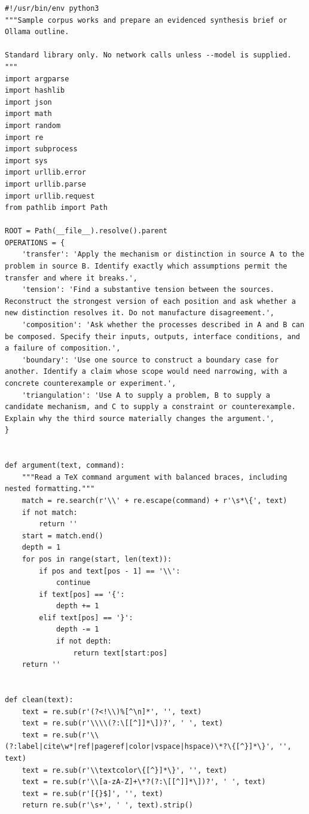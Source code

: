 \documentclass[11pt]{article}
\begin{document}
\begin{lstlisting}
#!/usr/bin/env python3
"""Sample corpus works and prepare an evidenced synthesis brief or Ollama outline.

Standard library only. No network calls unless --model is supplied.
"""
import argparse
import hashlib
import json
import math
import random
import re
import subprocess
import sys
import urllib.error
import urllib.parse
import urllib.request
from pathlib import Path

ROOT = Path(__file__).resolve().parent
OPERATIONS = {
    'transfer': 'Apply the mechanism or distinction in source A to the problem in source B. Identify exactly which assumptions permit the transfer and where it breaks.',
    'tension': 'Find a substantive tension between the sources. Reconstruct the strongest version of each position and ask whether a new distinction resolves it. Do not manufacture disagreement.',
    'composition': 'Ask whether the processes described in A and B can be composed. Specify their inputs, outputs, interface conditions, and a failure of composition.',
    'boundary': 'Use one source to construct a boundary case for another. Identify a claim whose scope would need narrowing, with a concrete counterexample or experiment.',
    'triangulation': 'Use A to supply a problem, B to supply a candidate mechanism, and C to supply a constraint or counterexample. Explain why the third source materially changes the argument.',
}


def argument(text, command):
    """Read a TeX command argument with balanced braces, including nested formatting."""
    match = re.search(r'\\' + re.escape(command) + r'\s*\{', text)
    if not match:
        return ''
    start = match.end()
    depth = 1
    for pos in range(start, len(text)):
        if pos and text[pos - 1] == '\\':
            continue
        if text[pos] == '{':
            depth += 1
        elif text[pos] == '}':
            depth -= 1
            if not depth:
                return text[start:pos]
    return ''


def clean(text):
    text = re.sub(r'(?<!\\)%[^\n]*', '', text)
    text = re.sub(r'\\\\(?:\[[^]]*\])?', ' ', text)
    text = re.sub(r'\\(?:label|cite\w*|ref|pageref|color|vspace|hspace)\*?\{[^}]*\}', '', text)
    text = re.sub(r'\\textcolor\{[^}]*\}', '', text)
    text = re.sub(r'\\[a-zA-Z]+\*?(?:\[[^]]*\])?', ' ', text)
    text = re.sub(r'[{}$]', '', text)
    return re.sub(r'\s+', ' ', text).strip()



\end{lstlisting}
\end{document}
